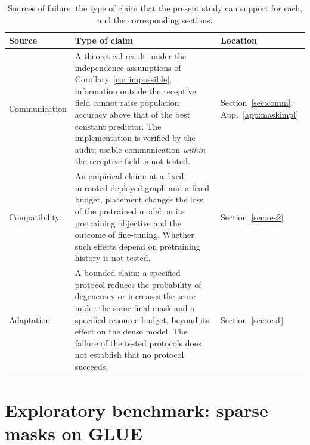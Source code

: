 \documentclass[10pt]{article}
\begin{document}
\begin{table}[t]
\centering
\caption{Sources of failure, the type of claim that the present study can support for each, and the corresponding sections.}
\label{tab:claims}
\small
\begin{tabular}{p{2.4cm}p{8.4cm}p{3.0cm}}
\toprule
Source & Type of claim & Location \\
\midrule
Communication & A theoretical result: under the independence assumptions of Corollary~\ref{cor:impossible}, information outside the receptive field cannot raise population accuracy above that of the best constant predictor. The implementation is verified by the audit; usable communication \emph{within} the receptive field is not tested. & Section~\ref{sec:comm}; App.~\ref{app:maskimpl} \\
Compatibility & An empirical claim: at a fixed unrooted deployed graph and a fixed budget, placement changes the loss of the pretrained model on its pretraining objective and the outcome of fine-tuning. Whether such effects depend on pretraining history is not tested. & Section~\ref{sec:res2} \\
Adaptation & A bounded claim: a specified protocol reduces the probability of degeneracy or increases the score under the same final mask and a specified resource budget, beyond its effect on the dense model. The failure of the tested protocols does not establish that no protocol succeeds. & Section~\ref{sec:res1} \\
\bottomrule
\end{tabular}
\end{table}

\section{Exploratory benchmark: sparse masks on GLUE}
\label{sec:pilot}
\label{sec:results}
\end{document}
